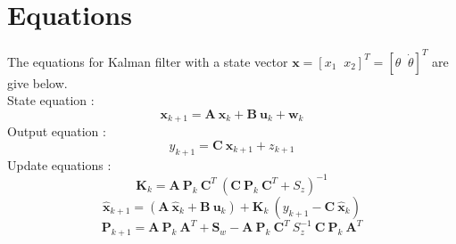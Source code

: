 \section{Equations}
The equations for Kalman filter with a state vector $\bm{x} = [x_1\;\;x_2]^T = [\theta\;\;\dot{\theta}]^T$ are give below.\\

State equation :
\begin{equation}
\label{eqn:5_kalmanstate}
\bm{x}_{k+1} = \bm{A}\:\bm{x}_k + \bm{B}\:\bm{u}_k + \bm{w}_k
\end{equation}
Output equation :
\begin{equation}
\label{eqn:5_kalmanop}
y_{k+1} = \bm{C}\:\bm{x}_{k+1} + z_{k+1}
\end{equation}
Update equations :
\begin{equation}
\label{eqn:5_kalmanK}
\bm{K}_k = \bm{A}\:\bm{P}_k\:\bm{C}^T\:\left( \bm{C}\:\bm{P}_k\:\bm{C}^T + S_z\right)^{-1}
\end{equation}
\begin{equation}
\label{eqn:5_kalmanhat}
\hat{\bm{x}}_{k+1} = \left( \bm{A}\:\hat{\bm{x}}_k + \bm{B}\:\bm{u}_k \right ) + \bm{K}_k\:\left ( y_{k+1} - \bm{C}\:\hat{\bm{x}}_k\right)
\end{equation}
\begin{equation}
\label{eqn:5_kalmanP}
\bm{P}_{k+1} = \bm{A}\:\bm{P}_k\:\bm{A}^T + \bm{S}_w - \bm{A}\:\bm{P}_k\:\bm{C}^T\:S_z^{-1}\:\bm{C}\:\bm{P}_k\:\bm{A}^T
\end{equation}

